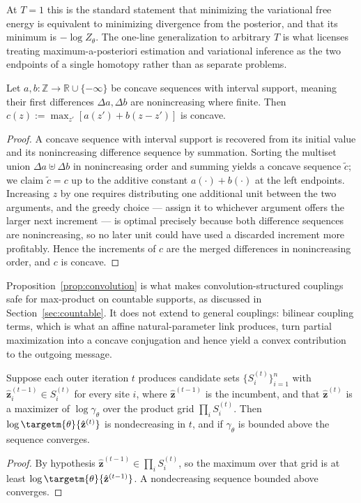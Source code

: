 At $T = 1$ this is the standard statement that minimizing the variational free energy is equivalent to minimizing divergence from the posterior, and that its minimum is $-\log Z_{\theta}$. The one-line generalization to arbitrary $T$ is what licenses treating maximum-a-posteriori estimation and variational inference as the two endpoints of a single homotopy rather than as separate problems.

\begin{proposition}
\label{prop:convolution}
Let $a, b: \mathbb{Z} \rightarrow \mathbb{R} \cup \{-\infty\}$ be concave sequences with interval support, meaning their first differences $\Delta a, \Delta b$ are nonincreasing where finite. Then $c(z) := \max_{z'} \left[ a(z') + b(z - z') \right]$ is concave.
\end{proposition}
\begin{proof}
A concave sequence with interval support is recovered from its initial value and its nonincreasing difference sequence by summation. Sorting the multiset union $\Delta a \uplus \Delta b$ in nonincreasing order and summing yields a concave sequence $\tilde{c}$; we claim $\tilde{c} = c$ up to the additive constant $a(\cdot) + b(\cdot)$ at the left endpoints. Increasing $z$ by one requires distributing one additional unit between the two arguments, and the greedy choice --- assign it to whichever argument offers the larger next increment --- is optimal precisely because both difference sequences are nonincreasing, so no later unit could have used a discarded increment more profitably. Hence the increments of $c$ are the merged differences in nonincreasing order, and $c$ is concave.
\end{proof}

Proposition~\ref{prop:convolution} is what makes convolution-structured couplings safe for max-product on countable supports, as discussed in Section~\ref{sec:countable}. It does not extend to general couplings: bilinear coupling terms, which is what an affine natural-parameter link produces, turn partial maximization into a concave conjugation and hence yield a convex contribution to the outgoing message.

\begin{proposition}
\label{prop:elitism}
Suppose each outer iteration $t$ produces candidate sets $\{S_i^{(t)}\}_{i=1}^n$ with $\hat{\mathbf{z}}^{(t-1)}_i \in S_i^{(t)}$ for every site $i$, where $\hat{\mathbf{z}}^{(t-1)}$ is the incumbent, and that $\hat{\mathbf{z}}^{(t)}$ is a maximizer of $\log \gamma_\theta$ over the product grid $\prod_i S_i^{(t)}$. Then $\log \targetm{\theta}{\hat{\mathbf{z}}^{(t)}}$ is nondecreasing in $t$, and if $\gamma_\theta$ is bounded above the sequence converges.
\end{proposition}
\begin{proof}
By hypothesis $\hat{\mathbf{z}}^{(t-1)} \in \prod_i S_i^{(t)}$, so the maximum over that grid is at least $\log \targetm{\theta}{\hat{\mathbf{z}}^{(t-1)}}$. A nondecreasing sequence bounded above converges.
\end{proof}

